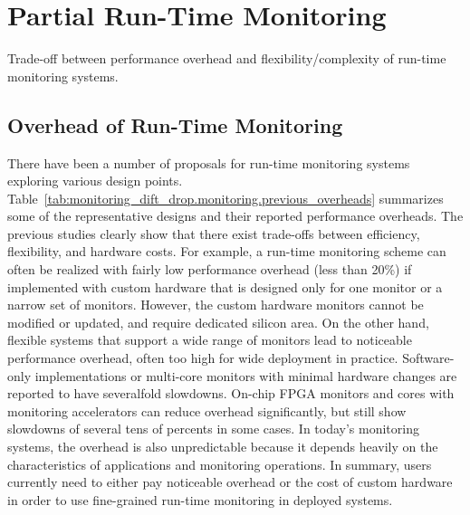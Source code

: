 \section{Partial Run-Time Monitoring}
\label{sec:monitoring_dift_drop.monitoring}

\begin{table}
  \begin{center}
    \begin{footnotesize}
    
    \end{footnotesize}
    \caption{Trade-off between performance overhead and flexibility/complexity
    of run-time monitoring systems.}
    \label{tab:monitoring_dift_drop.monitoring.previous_overheads}
  \end{center}
\end{table}

\subsection{Overhead of Run-Time Monitoring}

There have been a number of proposals for run-time monitoring systems exploring
various design points.
Table~\ref{tab:monitoring_dift_drop.monitoring.previous_overheads} summarizes
some of the representative designs and their reported performance overheads.
The previous studies clearly show that there exist trade-offs between
efficiency, flexibility, and hardware costs.  For example, a run-time
monitoring scheme can often be realized with fairly low performance overhead
(less than 20\%) if implemented with custom hardware that is designed only for
one monitor or a narrow set of monitors. However, the custom hardware monitors
cannot be modified or updated, and require dedicated silicon area.  On the
other hand, flexible systems that support a wide range of monitors lead to
noticeable performance overhead, often too high for wide deployment in
practice.  Software-only implementations \cite{nagarajan-interact08,
lift-micro06, purify-usenix92, taintcheck-ndsss05} or multi-core monitors with
minimal hardware changes \cite{lba-asid06} are reported to have severalfold
slowdowns.  On-chip FPGA monitors \cite{flexcore-micro10} and cores with
monitoring accelerators \cite{lba-isca08, fade-hpca14} can reduce overhead
significantly, but still show slowdowns of several tens of percents in some
cases.  In today's monitoring systems, the overhead is also unpredictable
because it depends heavily on the characteristics of applications and
monitoring operations.  In summary, users currently need to either pay
noticeable overhead or the cost of custom hardware in order to use fine-grained
run-time monitoring in deployed systems.


